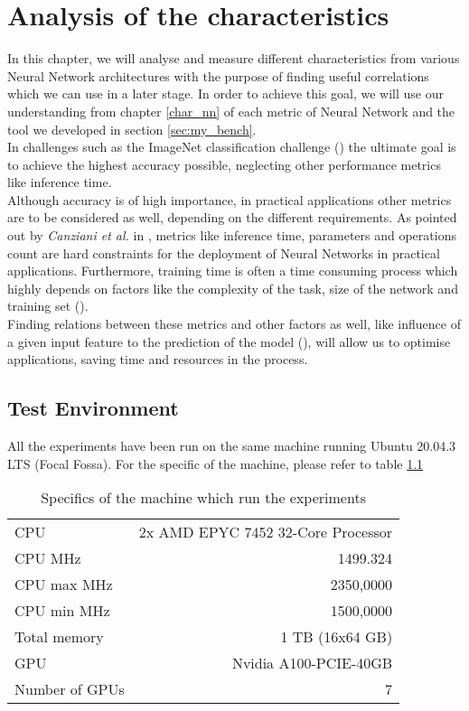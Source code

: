 \chapter{Analysis of the characteristics}\label{ana_char}
In this chapter, we will analyse and measure different characteristics from various Neural Network architectures with the purpose of finding useful correlations which we can use in a later stage. In order to achieve this goal, we will use our understanding from chapter \ref{char_nn} of each metric of Neural Network and the tool we developed in section \ref{sec:my_bench}. \\
In challenges such as the ImageNet classification challenge (\cite{ILSVRC15}) the ultimate goal is to achieve the highest accuracy possible, neglecting other performance metrics like inference time. \cite{DBLP:journals/corr/CanzianiPC16}\\
Although accuracy is of high importance, in practical applications other metrics are to be considered as well, depending on the different requirements. As pointed out by \textit{Canziani et al.} in \cite{DBLP:journals/corr/CanzianiPC16}, metrics like inference time, parameters and operations count are hard constraints for the deployment of Neural Networks in practical applications. Furthermore, training time is often a time consuming process which highly depends on factors like the complexity of the task, size of the network and training set (\cite{118273}). \\
Finding relations between these metrics and other factors as well, like influence of a given input feature to the prediction of the model (\cite{hooker2019benchmark}), will allow us to optimise applications, saving time and resources in the process.
\section{Test Environment}
All the experiments have been run on the same machine running Ubuntu 20.04.3 LTS (Focal Fossa). For the specific of the machine, please refer to table \ref{tab:gpu_info}
\begin{table}[h]
\centering
\begin{tabular}{|l  |r|}
 \hline
CPU & 2x AMD EPYC 7452 32-Core Processor\\
CPU MHz&                     1499.324\\
CPU max MHz&                     2350,0000\\
CPU min MHz&                     1500,0000\\
Total memory&       1 TB (16x64 GB)\\
GPU&    Nvidia A100-PCIE-40GB\\
Number of GPUs & 7\\
\hline
\end{tabular}
\caption{Specifics of the machine which run the experiments}
\label{tab:gpu_info}
\end{table}

